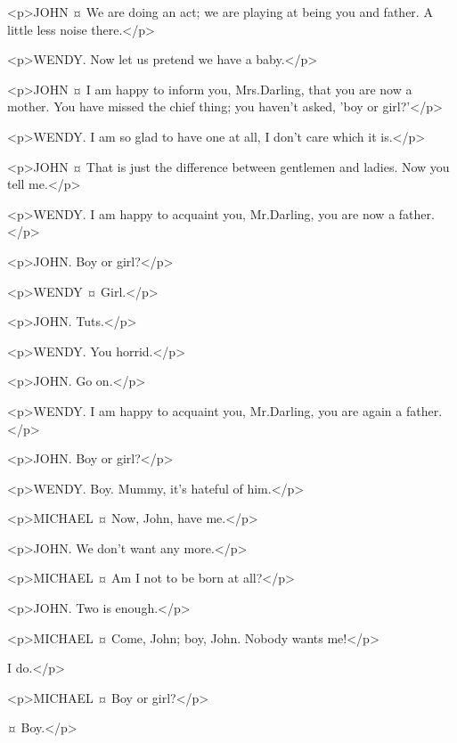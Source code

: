 <p>JOHN ¤
We are doing an act; we are playing at being you and father.
A little less noise there.</p>

<p>WENDY. Now let us pretend we have a baby.</p>

<p>JOHN ¤
I am happy to inform you, Mrs.\@ Darling, that you are now a mother.
You have missed the chief thing; you haven't asked, 'boy or girl?'</p>

<p>WENDY. I am so glad to have one at all, I don't care which it is.</p>

<p>JOHN ¤
That is just the difference between gentlemen and ladies. Now you tell me.</p>

<p>WENDY. I am happy to acquaint you, Mr.\@ Darling, you are now a father.</p>

<p>JOHN. Boy or girl?</p>

<p>WENDY ¤
Girl.</p>

<p>JOHN. Tuts.</p>

<p>WENDY. You horrid.</p>

<p>JOHN. Go on.</p>

<p>WENDY. I am happy to acquaint you, Mr.\@ Darling, you are again a father.</p>

<p>JOHN. Boy or girl?</p>

<p>WENDY. Boy.
Mummy, it's hateful of him.</p>


<p>MICHAEL ¤
Now, John, have me.</p>

<p>JOHN. We don't want any more.</p>

<p>MICHAEL ¤
Am I not to be born at all?</p>

<p>JOHN. Two is enough.</p>

<p>MICHAEL ¤
Come, John; boy, John.
Nobody wants me!</p>

\mrsdarlingspeaks
I do.</p>

<p>MICHAEL ¤
Boy or girl?</p>

\mrsdarlingspeaks {}¤
Boy.</p>

